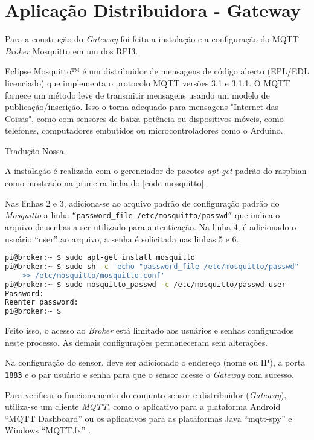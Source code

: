 \section{Aplicação Distribuidora - Gateway}
\label{sec:app-gw}

Para a construção do \emph{Gateway} foi feita a instalação e a configuração do
MQTT \emph{Broker} Mosquitto em um dos RPI3.

\begin{citacao}

	Eclipse Mosquitto™ é um distribuidor de mensagens de código aberto (EPL/EDL
	licenciado) que implementa o protocolo MQTT versões 3.1 e 3.1.1. O MQTT
	fornece um método leve de transmitir mensagens usando um modelo de
	publicação/inscrição. Isso o torna adequado para mensagens "Internet das
	Coisas", como com sensores de baixa potência ou dispositivos móveis, como
	telefones, computadores embutidos ou microcontroladores como o Arduino. \

	 Tradução Nossa.
\end{citacao}


A instalação é realizada com o gerenciador de pacotes \emph{apt-get} padrão do
raspbian como mostrado na primeira linha do \autoref{code-mosquitto}.

Nas linhas 2 e 3, adiciona-se ao arquivo padrão de configuração padrão do
\emph{Mosquitto} a linha \texttt{``password\_file /etc/mosquitto/passwd''} que
indica o arquivo de senhas a ser utilizado para autenticação. Na linha 4, é
adicionado o usuário ``user'' ao arquivo, a senha é solicitada  nas
linhas 5 e 6.

\begin{lstlisting}[language=bash,caption={Instalação e configuração do Mosquitto},label=code-mosquitto]
pi@broker:~ $ sudo apt-get install mosquitto
pi@broker:~ $ sudo sh -c 'echo "password_file /etc/mosquitto/passwd"
	>> /etc/mosquitto/mosquitto.conf'
pi@broker:~ $ sudo mosquitto_passwd -c /etc/mosquitto/passwd user
Password:
Reenter password:
pi@broker:~ $
\end{lstlisting}

Feito isso, o acesso ao \emph{Broker} está limitado aos usuários e senhas
configurados neste processo. As demais configurações permaneceram sem alterações.

Na configuração do sensor, deve ser adicionado o endereço (nome ou IP), a porta
\texttt{1883} e o par usuário e senha para que o sensor acesse o \emph{Gateway} com
sucesso.

Para verificar o funcionamento do conjunto sensor e distribuidor (\emph{Gateway}), utiliza-se um
cliente \emph{MQTT}, como o aplicativo para a plataforma Android ``MQTT Dashboard''
\cite{mqttdash} ou os aplicativos para as plataformas Java ``mqtt-spy''
\cite{mqttspy} e Windows ``MQTT.fx'' \cite{mqttfx}.

